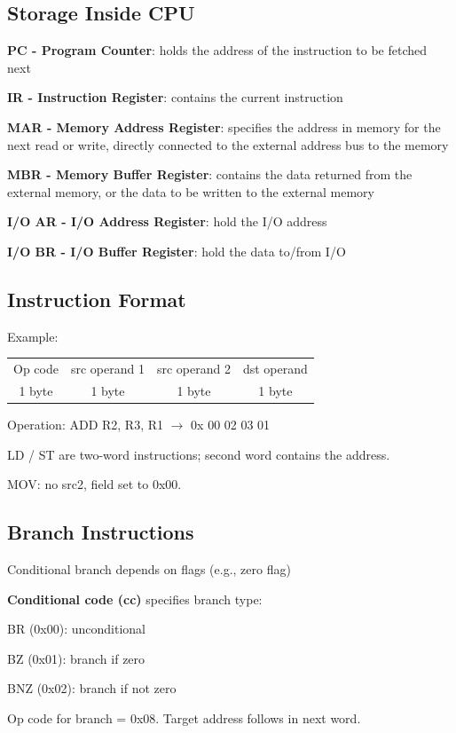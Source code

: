\documentclass[11pt,a4paper]{article}
\begin{document}
\subsection{Storage Inside CPU}
\textbf{PC - Program Counter}: holds the address of the instruction to be fetched next \par
\textbf{IR - Instruction Register}: contains the current instruction \par
\textbf{MAR - Memory Address Register}: specifies the address in memory for the next read or write, directly connected to the external address bus to the memory \par
\textbf{MBR - Memory Buffer Register}: contains the data returned from the external memory, or the data to be written to the external memory \par
\textbf{I/O AR - I/O Address Register}: hold the I/O address \par
\textbf{I/O BR - I/O Buffer Register}: hold the data to/from I/O \par

\subsection{Instruction Format}
Example: \par
\begin{tabular}{c|c|c|c}
    Op code & src operand 1 & src operand 2 & dst operand \\
    1 byte & 1 byte & 1 byte & 1 byte
\end{tabular}
\par
Operation: ADD R2, R3, R1 $\rightarrow$ 0x 00 02 03 01 \par

 \par
LD / ST are two-word instructions; second word contains the address. \par
MOV: no src2, field set to 0x00.

\subsection{Branch Instructions}
Conditional branch depends on flags (e.g., zero flag) \par
\textbf{Conditional code (cc)} specifies branch type: \par
\quad BR (0x00): unconditional \par
\quad BZ (0x01): branch if zero \par
\quad BNZ (0x02): branch if not zero \par
Op code for branch = 0x08. Target address follows in next word. \par
\end{document}
